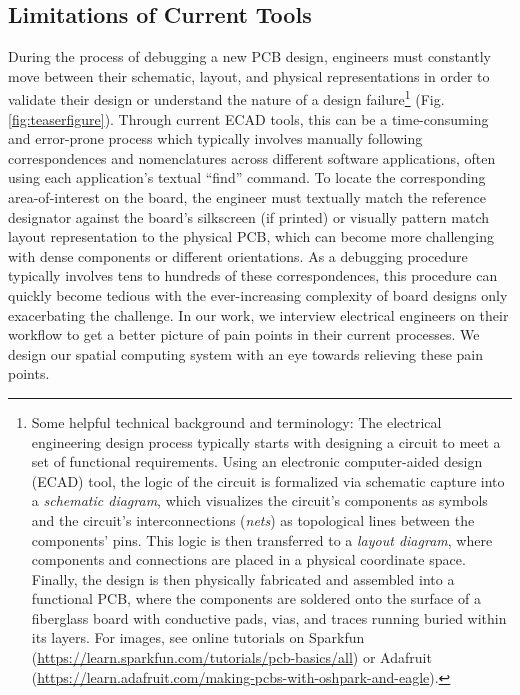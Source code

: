 \documentclass [11pt, proquest] {uwthesis}[2020/02/24]
\begin{document}
\subsection{Limitations of Current Tools}

During the process of debugging a new PCB design, engineers must constantly move between their schematic, layout, and physical representations in order to validate their design or understand the nature of a design failure\footnote{Some helpful technical background and terminology: The electrical engineering design process typically starts with designing a circuit to meet a set of functional requirements.
Using an electronic computer-aided design (ECAD) tool, the logic of the circuit is formalized via schematic capture into a \textit{schematic diagram}, which visualizes the circuit's components as symbols and the circuit's interconnections (\textit{nets}) as topological lines between the components' pins.
This logic is then transferred to a \textit{layout diagram}, where components and connections are placed in a physical coordinate space.
Finally, the design is then physically fabricated and assembled into a functional PCB, where the components are soldered onto the surface of a fiberglass board with conductive pads, vias, and traces running buried within its layers. For images, see online tutorials on Sparkfun (\url{https://learn.sparkfun.com/tutorials/pcb-basics/all}) or Adafruit (\url{https://learn.adafruit.com/making-pcbs-with-oshpark-and-eagle}).}
(Fig. \ref{fig:teaserfigure}).
Through current ECAD tools, this can be a time-consuming and error-prone process which typically involves manually following correspondences and nomenclatures
across different software applications, often using each application’s textual ``find'' command. To locate the corresponding area-of-interest on the board, the engineer must textually match the reference designator against the board’s silkscreen (if printed) or visually pattern match layout representation to the physical PCB, which can become more challenging with dense components or different orientations.
As a debugging procedure typically involves tens to hundreds of these correspondences, this procedure can quickly become tedious with the ever-increasing complexity of board designs only exacerbating the challenge. 
In our work, we interview electrical engineers on their workflow to get a better picture of pain points in their current processes. We design our spatial computing system with an eye towards relieving these pain points.
\end{document}
